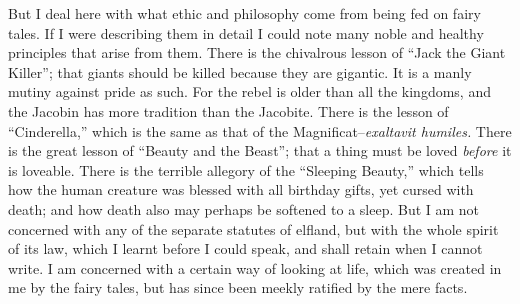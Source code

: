 \documentclass{book}
\begin{document}
But I deal here with what ethic and philosophy come from being fed on fairy tales. If I were describing them in detail I could note many noble and healthy principles that arise from them. There is the chivalrous lesson of “Jack the Giant Killer”; that giants should be killed because they are gigantic. It is a manly mutiny against pride as such. For the rebel is older than all the kingdoms, and the Jacobin has more tradition than the Jacobite. There is the lesson of “Cinderella,” which is the same as that of the Magnificat–\emph{exaltavit humiles.} There is the great lesson of “Beauty and the Beast”; that a thing must be loved \emph{before} it is loveable. There is the terrible allegory of the “Sleeping Beauty,” which tells how the human creature was blessed with all birthday gifts, yet cursed with death; and how death also may perhaps be softened to a sleep. But I am not concerned with any of the separate statutes of elfland, but with the whole spirit of its law, which I learnt before I could speak, and shall retain when I cannot write. I am concerned with a certain way of looking at life, which was created in me by the fairy tales, but has since been meekly ratified by the mere facts.
\end{document}
